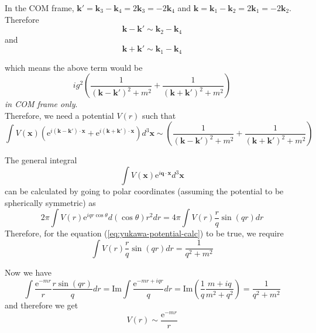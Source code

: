 \documentclass[11pt, notitlepage]{report}
\newcommand{\e}{\mathrm{e}}
\numberwithin{equation}{section}
\begin{document}
    In the COM frame, \(\textbf{k}' = \textbf{k}_3 - \textbf{k}_4 = 2\textbf{k}_3 = -2\textbf{k}_4\) and \(\textbf{k} = \textbf{k}_1 - \textbf{k}_2 = 2\textbf{k}_1 = -2\textbf{k}_2\). Therefore 
    \begin{equation*}
        \textbf{k} - \textbf{k}' \sim \textbf{k}_2 -  \textbf{k}_4
    \end{equation*}
    and  
    \begin{equation*}
        \textbf{k} + \textbf{k}' \sim \textbf{k}_1 -  \textbf{k}_4
    \end{equation*}

    which means the above term would be 
    \begin{equation}
        ig^2\left( \frac{1}{(\textbf{k} - \textbf{k}')^2 + m^2} + \frac{1}{(\textbf{k} + \textbf{k}')^2 + m^2 } \right)
    \end{equation}
    \textit{in COM frame only}.\\

    Therefore, we need a potential \(V(r)\) such that 
    \begin{equation*}
        \int V(\textbf{x}) \left( \e^{i(\textbf{k} - \textbf{k}') \cdot \textbf{x}} + \e^{i(\textbf{k} + \textbf{k}') \cdot \textbf{x}}\right)d^3\textbf{x} \sim \left( \frac{1}{(\textbf{k} - \textbf{k}')^2 + m^2} + \frac{1}{(\textbf{k} + \textbf{k}')^2 + m^2 } \right)
        \label{eq:yukawa-potential-calc}
    \end{equation*}

    The general integral 
    \begin{equation*}
        \int V(\textbf{x})\e^{i\textbf{q}\cdot \textbf{x}}d^3\textbf{x}
    \end{equation*}
    can be calculated by going to polar coordinates (assuming the potential to be spherically symmetric) as
    \begin{equation*}
        2\pi \int V(r) \e^{iqr\cos\theta} d(\cos\theta)r^2dr = 4\pi \int V(r)\frac{r}{q} \sin(qr) dr
    \end{equation*}
    Therefore, for the equation (\ref{eq:yukawa-potential-calc}) to be true, we require
    \begin{equation*}
        \int V(r)\frac{r}{q} \sin(qr) dr = \frac{1}{q^2 + m^2}
    \end{equation*}

    Now we have 
    \begin{equation*}
        \int \frac{\e^{-mr}}{r}\frac{r\sin(qr)}{q} dr = \mathrm{Im}\int \frac{\e^{-mr+iqr}}{q} dr = \mathrm{Im}\left(\frac{1}{q}\frac{m+iq}{m^2 + q^2}\right) = \frac{1}{q^2 + m^2}
    \end{equation*}
    and therefore we get 
    \begin{equation*}
        V(r) \sim \frac{\e^{-mr}}{r}
    \end{equation*}
\end{document}
